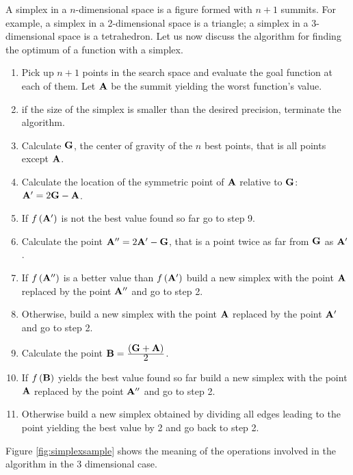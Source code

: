 \documentclass[twoside]{book}
\begin{document}
A simplex in a $n$-dimensional space is a figure formed with $n+1$
summits. For example, a simplex in a 2-dimensional space is a
triangle; a simplex in a 3-dimensional space is a tetrahedron.
Let us now discuss the algorithm for finding the optimum of a
function with a simplex.
\begin{enumerate}
  \item Pick up $n+1$ points in the search space and evaluate
  the goal function at each of them. Let ${\bf A}$ be the summit
  yielding the worst function's value.
  \item if the size of the simplex is smaller than the desired
  precision, terminate the algorithm.
  \item Calculate ${\bf G}$, the center of gravity of the $n$ best points,
  that is all points except ${\bf A}$.
  \item Calculate the location of the symmetric point of ${\bf A}$
  relative to ${\bf G}$: ${\bf A}^{\prime}=2{\bf G}-{\bf A}$.
  \item If $f\left({\bf A}^{\prime}\right)$ is not the best value
  found so far go to step 9.
  \item Calculate the point ${\bf A}^{\prime\prime}=2{\bf A}^{\prime}-{\bf
  G}$, that is a point twice as far from ${\bf G}$ as ${\bf
  A}^{\prime}$.
  \item If $f\left({\bf A}^{\prime\prime}\right)$ is a
  better value than $f\left({\bf A}^{\prime}\right)$ build a new
  simplex with the point ${\bf A}$ replaced by the point ${\bf
  A}^{\prime\prime}$ and go to step 2.
  \item Otherwise, build a new
  simplex with the point ${\bf A}$ replaced by the point ${\bf
  A}^{\prime}$ and go to step 2.
  \item Calculate the point ${\bf B}= {\displaystyle\left({\bf G}+{\bf
A}\right)\over\displaystyle 2}$.
  \item If $f\left({\bf B}\right)$ yields the best value found so far
  build a new simplex with the point ${\bf A}$ replaced by the point ${\bf
  A}^{\prime\prime}$ and go to step 2.
  \item Otherwise build a new simplex obtained by dividing all
  edges leading to the point yielding the best value by 2 and go
  back to step 2.
\end{enumerate}
Figure \ref{fig:simplexsample} shows the meaning of the operations
involved in the algorithm in the 3 dimensional case.
\end{document}
